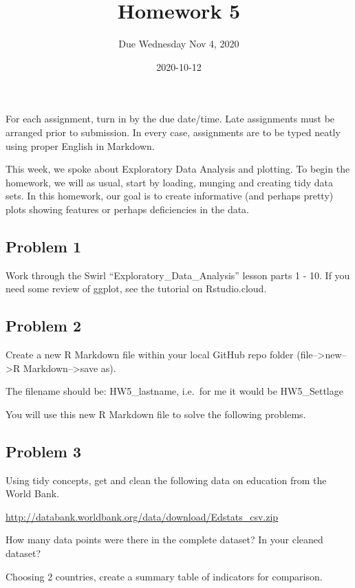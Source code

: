 \documentclass[]{article}
\title{Homework 5}
\subtitle{Due Wednesday Nov 4, 2020}
\author{}
\date{\vspace{-2.5em}2020-10-12}
\begin{document}
\maketitle

For each assignment, turn in by the due date/time. Late assignments must
be arranged prior to submission. In every case, assignments are to be
typed neatly using proper English in Markdown.

This week, we spoke about Exploratory Data Analysis and plotting. To
begin the homework, we will as usual, start by loading, munging and
creating tidy data sets. In this homework, our goal is to create
informative (and perhaps pretty) plots showing features or perhaps
deficiencies in the data.

\hypertarget{problem-1}{%
\subsection{Problem 1}\label{problem-1}}

Work through the Swirl ``Exploratory\_Data\_Analysis'' lesson parts 1 -
10. If you need some review of ggplot, see the tutorial on
Rstudio.cloud.

\hypertarget{problem-2}{%
\subsection{Problem 2}\label{problem-2}}

Create a new R Markdown file within your local GitHub repo folder
(file--\textgreater{}new--\textgreater{}R Markdown--\textgreater{}save
as).

The filename should be: HW5\_lastname, i.e.~for me it would be
HW5\_Settlage

You will use this new R Markdown file to solve the following problems.

\hypertarget{problem-3}{%
\subsection{Problem 3}\label{problem-3}}

Using tidy concepts, get and clean the following data on education from
the World Bank.

\url{http://databank.worldbank.org/data/download/Edstats_csv.zip}

How many data points were there in the complete dataset? In your cleaned
dataset?

Choosing 2 countries, create a summary table of indicators for
comparison.
\end{document}
